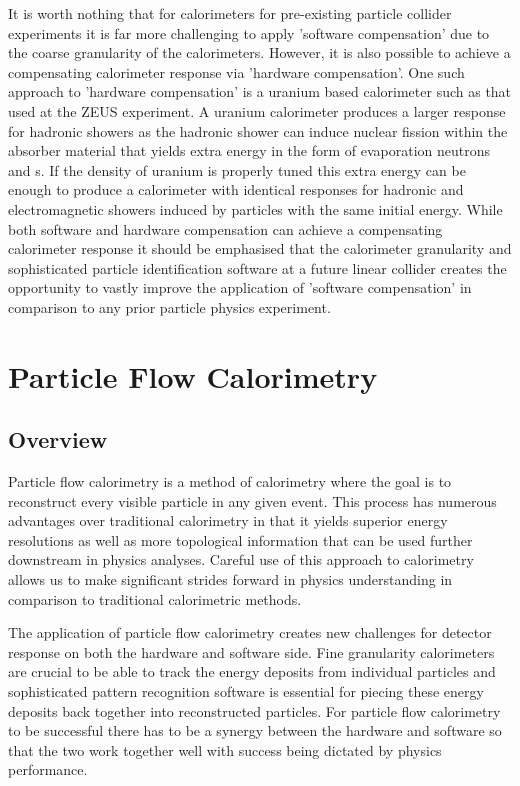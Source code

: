 It is worth nothing that for calorimeters for pre-existing particle collider experiments it is far more challenging to apply 'software compensation' due to the coarse granularity of the calorimeters.  However, it is also possible to achieve a compensating calorimeter response via 'hardware compensation'.  One such approach to 'hardware compensation' is a uranium based calorimeter such as that used at the ZEUS experiment.  A uranium calorimeter produces a larger response for hadronic showers as the hadronic shower can induce nuclear fission within the absorber material that yields extra energy in the form of evaporation neutrons and \gamma s.  If the density of uranium is properly tuned this extra energy can be enough to produce a calorimeter with identical responses for hadronic and electromagnetic showers induced by particles with the same initial energy.  While both software and hardware compensation can achieve a compensating calorimeter response it should be emphasised that the calorimeter granularity and sophisticated particle identification software at a future linear collider creates the opportunity to vastly improve the application of 'software compensation' in comparison to any prior particle physics experiment.

\section{Particle Flow Calorimetry}
\label{sec:unitarisation}

\subsection{Overview}
Particle flow calorimetry is a method of calorimetry where the goal is to reconstruct every visible particle in any given event.  This process has numerous advantages over traditional calorimetry in that it yields superior energy resolutions as well as more topological information that can be used further downstream in physics analyses.  Careful use of this approach to calorimetry allows us to make significant strides forward in physics understanding in comparison to traditional calorimetric methods.

The application of particle flow calorimetry creates new challenges for detector response on both the hardware and software side.  Fine granularity calorimeters are crucial to be able to track the energy deposits from individual particles and sophisticated pattern recognition software is essential for piecing these energy deposits back together into reconstructed particles.  For particle flow calorimetry to be successful there has to be a synergy between the hardware and software so that the two work together well with success being dictated by physics performance.  

